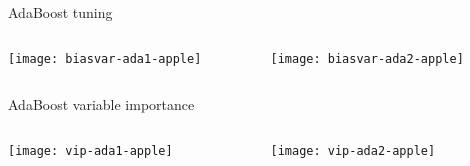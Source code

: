 
\begin{frame}{AdaBoost tuning}




\begin{columns}[T]
\hspace*{-2.4em}\begin{column}{0.5\textwidth}
	\texttt{[image: biasvar-ada1-apple]}
\end{column}
\begin{column}{0.5\textwidth}
	\texttt{[image: biasvar-ada2-apple]}
\end{column}
\end{columns}

\end{frame}


\begin{frame}{AdaBoost variable importance}



\begin{columns}[T]
\hspace*{-4em}\begin{column}{0.5\textwidth}
	\texttt{[image: vip-ada1-apple]}
\end{column}
\hspace*{-1em}\begin{column}{0.5\textwidth}
	\texttt{[image: vip-ada2-apple]}
\end{column}
\end{columns}

\end{frame}



